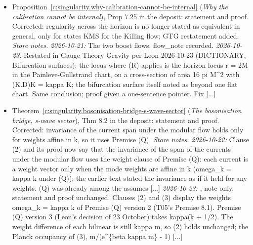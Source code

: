 \documentclass[11pt]{article}
\theoremstyle{definition}
\theoremstyle{plain}
\begin{document}
\begin{itemize}
\item Proposition~\ref{c:singularity.why-calibration-cannot-be-internal} (\emph{Why the calibration cannot be internal}), Prop 7.25 in the deposit: statement and proof. Corrected: regularity across the horizon is no longer stated as equivalent in general, only for states KMS for the Killing flow; GTG restatement added. \emph{Store notes.} \emph{2026-10-21:} The two boost flows: flow\_note recorded. \emph{2026-10-23:} Restated in Gauge Theory Gravity per Leon 2026-10-23 (DICTIONARY, Bifurcation surfaces): the locus where (R) applies is the horizon locus r = 2M in the Painleve-Gullstrand chart, on a cross-section of area 16 pi M\^{}2 with (K.D)K = kappa K; the bifurcation surface itself noted as beyond one flat chart. Same conclusion; proof given a one-sentence pointer. Fix [...]
\item Theorem~\ref{c:singularity.bosonisation-bridge-s-wave-sector} (\emph{The bosonisation bridge, s-wave sector}), Thm 8.2 in the deposit: statement and proof. Corrected: invariance of the current span under the modular flow holds only for weights affine in k, so it uses Premise (Q). \emph{Store notes.} \emph{2026-10-22:} Clause (2) and its proof now say that the invariance of the span of the currents under the modular flow uses the weight clause of Premise (Q): each current is a weight vector only when the mode weights are affine in k (omega\_k = kappa k under (Q)); the earlier text stated the invariance as if it held for any weights. (Q) was already among the assumes [...] \emph{2026-10-23:} , note only, statement and proof unchanged. Clauses (2) and (3) display the weights omega\_k = kappa k of Premise (Q) version 2 (T05's Premise 8.1). Premise (Q) version 3 (Leon's decision of 23 October) takes kappa(k + 1/2). The weight difference of each bilinear is still kappa m, so (2) holds unchanged; the Planck occupancy of (3), m/(e\^{}\{beta kappa m\} - 1) [...]
\end{itemize}
\end{document}
